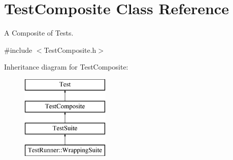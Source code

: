 \hypertarget{class_test_composite}{\section{Test\-Composite Class Reference}
\label{class_test_composite}
}


A Composite of Tests.  




{\ttfamily \#include $<$Test\-Composite.\-h$>$}

Inheritance diagram for Test\-Composite\-:\begin{figure}[H]
\begin{center}
\leavevmode
\includegraphics[height=4.000000cm]{class_test_composite}
\end{center}
\end{figure}
